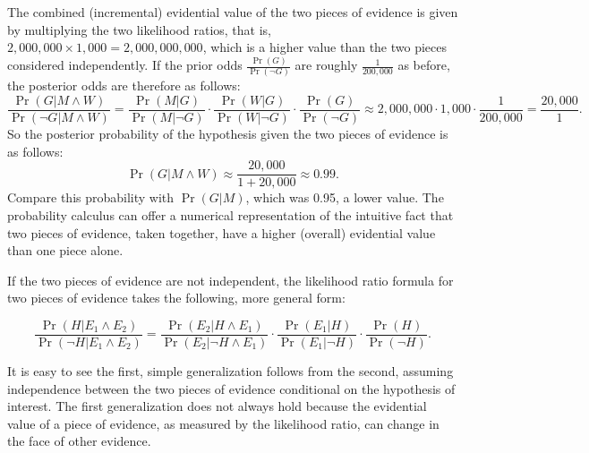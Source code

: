 \documentclass[10pt]{article}
\begin{document}
The combined (incremental) evidential value of the two pieces of evidence is given by multiplying the two likelihood 
ratios, that is, $2,000,000\times 1,000=2,000,000,000$, which is a higher value 
than the two pieces considered independently. 
If the prior odds $\frac{\Pr(G)}{\Pr(\neg G)}$ are roughly $\frac{1}{200,000}$
as before, the posterior odds are therefore as follows:
%
\[\frac{\Pr(G|M\wedge W)}{\Pr(\neg G|M\wedge W)}= \frac{\Pr(M |G)}{\Pr( M | \neg G)}\cdot \frac{\Pr(W |G)}{\Pr( W | \neg G)}\cdot \frac{\Pr(G)}{\Pr(\neg G)} \approx 2,000,000 \cdot 1,000 \cdot \frac{1}{200,000}= \frac{20,000}{1}.\]
% 
So the posterior probability of the hypothesis given the two pieces of evidence is as follows:
%
\[\Pr(G|M\wedge W) \approx \frac{20,000}{1+20,000}\approx 0.99.\]
%
Compare this probability with $\Pr(G|M)$, which 
was 0.95, a lower value. The probability calculus can offer a numerical 
representation of the intuitive fact that two pieces of evidence, taken together, 
have a higher (overall) evidential value than one piece alone. 

 If the two pieces of evidence are not independent, 
the likelihood ratio formula for two pieces of evidence 
takes the following, more general 
form:

	\[ \frac{\Pr(H|E_1 \land E_2)}{\Pr(\neg H | E_1 \land E_2)} = 
	\frac{\Pr(E_2 | H \land E_1)}{\Pr(E_2| \neg H \land E_1)}
	\cdot 
	\frac{\Pr(E_1 | H)}{\Pr(E_1| \neg H)}
	\cdot 
	\frac{\Pr(H)}{\Pr(\neg H)}.\]

\noindent It is easy to see the first, simple generalization follows from the second, assuming 
independence between the two pieces of evidence conditional on the hypothesis of interest. 
The first generalization does not always hold because 
the evidential value of a piece of evidence, as measured by the likelihood ratio, 
can change in the face of other evidence. 







\end{document}
